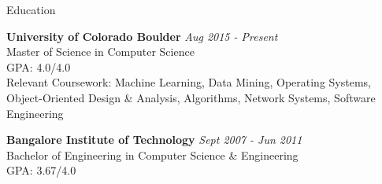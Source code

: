 
\begin{rSection}{Education}

{\bf University of Colorado Boulder} \hfill {\em Aug 2015 - Present}
\\ \hfill Master of Science in Computer Science
\\ GPA: 4.0/4.0
\\ Relevant Coursework: Machine Learning, Data Mining, Operating Systems, Object-Oriented Design \& Analysis, Algorithms, Network Systems, Software Engineering

{\bf Bangalore Institute of Technology} \hfill {\em Sept 2007 - Jun 2011}
\\ \hfill Bachelor of Engineering in Computer Science \& Engineering
\\ GPA: 3.67/4.0

\end{rSection}

